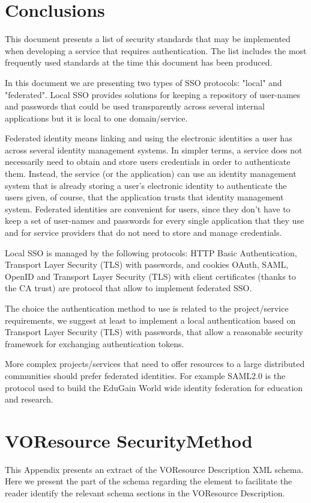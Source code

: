 \documentclass[11pt,a4paper]{ivoa}
\begin{document}
\section{Conclusions}
This document presents a list of security standards that may be implemented when developing a service that requires authentication.
The list includes the most frequently used standards at the time this document has been produced. 

In this document we are presenting two types of  SSO protocols: "local" and "federated". 
Local SSO  provides solutions for keeping a repository of user-names and passwords 
that could be used transparently across several internal applications but it is local to one domain/service.

Federated identity means linking and using the electronic identities a user has across several identity management systems.
In simpler terms, a service does not necessarily need to obtain and store users credentials in order to authenticate them. Instead, the service (or the application) can use an identity management system that is already storing a user's electronic identity 
to authenticate the users given, of course, that the application trusts that identity management system.
Federated identities are convenient for users, since they don't have to keep a set of user-names and passwords for every single application that they use and for service providers that do not need to store and manage credentials.

Local SSO is managed by  the following protocols: HTTP Basic Authentication,  Transport Layer Security (TLS) with passwords, and cookies
OAuth, SAML, OpenID and Transport Layer Security (TLS) with client certificates (thanks to the CA trust) are protocol that 
allow to implement  federated SSO. 

The choice the authentication method to use is related to the project/service requirements, we suggest at least to implement 
a local authentication based on Transport Layer Security (TLS) with passwords, that allow a reasonable security 
framework for exchanging authentication tokens. 

More complex projects/services that need to offer resources to a large distributed communities should prefer federated identities. 
For example SAML2.0 is the protocol used to build the EduGain World wide identity federation  for education and research.



\appendix 
\section{VOResource  SecurityMethod}
This Appendix presents an extract of the VOResource Description XML schema.
Here we present the part of the schema regarding the    element 
to facilitate the reader identify the relevant schema sections in the VOResource Description. 
\end{document}
